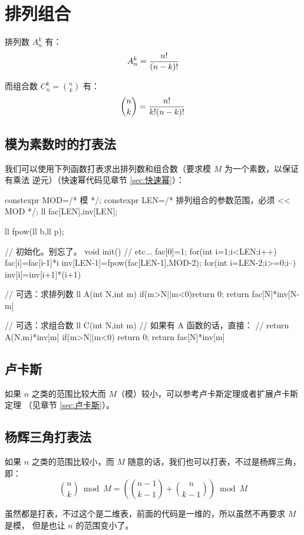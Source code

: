 \section{排列组合}
排列数 $A_n^k$ 有：\[
    A_n^k = {n! \over (n-k)!}
\]

而组合数 $C_n^k = {n \choose k}$ 有：\[
    {n \choose k} = {n! \over k! (n-k)!}
\]



\subsection{模为素数时的打表法}
我们可以使用下列函数打表求出排列数和组合数（要求模 $M$ 为一个素数，以保证有乘法
逆元）（快速幂代码见章节 \ref{sec:快速幂}）：
\begin{Cpp}
constexpr MOD=/* 模 */;
constexpr LEN=/* 排列组合的参数范围，必须 << MOD */;
ll fac[LEN],inv[LEN];

ll fpow(ll b,ll p);

// 初始化。别忘了。
void init(){
  // etc...
  fac[0]=1;
  for(int i=1;i<LEN;i++)
    fac[i]=fac[i-1]*i%
  inv[LEN-1]=fpow(fac[LEN-1],MOD-2);
  for(int i=LEN-2;i>=0;i--)
    inv[i]=inv[i+1]*(i+1)%
}

// 可选：求排列数
ll A(int N,int m){
  if(m>N||m<0)return 0;
  return fac[N]*inv[N-m]%
}

// 可选：求组合数
ll C(int N,int m){
  // 如果有 A 函数的话，直接：
  // return A(N,m)*inv[m]%
  if(m>N||m<0) return 0;
  return fac[N]*inv[m]%
}
\end{Cpp}



\subsection{卢卡斯}
如果 $n$ 之类的范围比较大而 $M$（模）较小，可以参考卢卡斯定理或者扩展卢卡斯定理
（见章节 \ref{sec:卢卡斯}）。



\subsection{杨辉三角打表法}
如果 $n$ 之类的范围比较小，而 $M$ 随意的话，我们也可以打表，不过是杨辉三角，即：
\[
    {n \choose k} \bmod M = \left({n - 1 \choose k - 1} + {n \choose k -
    1}\right) \bmod M
\]

虽然都是打表，不过这个是二维表，前面的代码是一维的，所以虽然不再要求 $M$ 是模，
但是也让 $n$ 的范围变小了。

